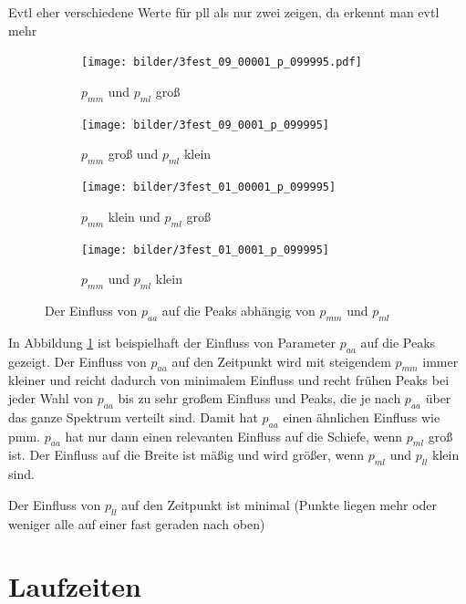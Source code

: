 

Evtl eher verschiedene Werte für pll als nur zwei zeigen, da erkennt man evtl mehr



\begin{figure}[H]
\begin{subfigure}[t]{0.5\textwidth}
\texttt{[image: bilder/3fest\_09\_00001\_p\_099995.pdf]}
\caption{$p_{mm}$ und $p_{ml}$ groß}
\end{subfigure}
\begin{subfigure}[t]{0.5\textwidth}
\texttt{[image: bilder/3fest\_09\_0001\_p\_099995]}
\caption{$p_{mm}$ groß und $p_{ml}$ klein}
\end{subfigure}
\vspace*{7mm}
\begin{subfigure}[b]{0.5\textwidth}
\texttt{[image: bilder/3fest\_01\_00001\_p\_099995]}
\caption{$p_{mm}$ klein und $p_{ml}$ groß}
\end{subfigure}
\begin{subfigure}[b]{0.5\textwidth}
\texttt{[image: bilder/3fest\_01\_0001\_p\_099995]}
\caption{$p_{mm}$ und $p_{ml}$ klein}
\end{subfigure}
\caption{Der Einfluss von $p_{aa}$ auf die Peaks abhängig von $p_{mm}$ und $p_{ml}$}
\label{einfluss_paa}
\end{figure}

In Abbildung \ref{einfluss_paa} ist beispielhaft der Einfluss von Parameter $p_{aa}$ auf die Peaks gezeigt. Der Einfluss von $p_{aa}$ auf den Zeitpunkt wird mit steigendem $p_{mm}$ immer kleiner und reicht dadurch von minimalem Einfluss und recht frühen Peaks bei jeder Wahl von $p_{aa}$ bis zu sehr großem Einfluss und Peaks, die je nach $p_{aa}$ über das ganze Spektrum verteilt sind. Damit hat $p_{aa}$ einen ähnlichen Einfluss wie pmm. $p_{aa}$ hat nur dann einen relevanten Einfluss auf die Schiefe, wenn $p_{ml}$ groß ist. Der Einfluss auf die Breite ist mäßig und wird größer, wenn $p_{ml}$ und $p_{ll}$ klein sind.

Der Einfluss von $p_{ll}$ auf den Zeitpunkt ist minimal (Punkte liegen mehr oder weniger alle auf einer fast geraden nach oben)

\section{Laufzeiten}
